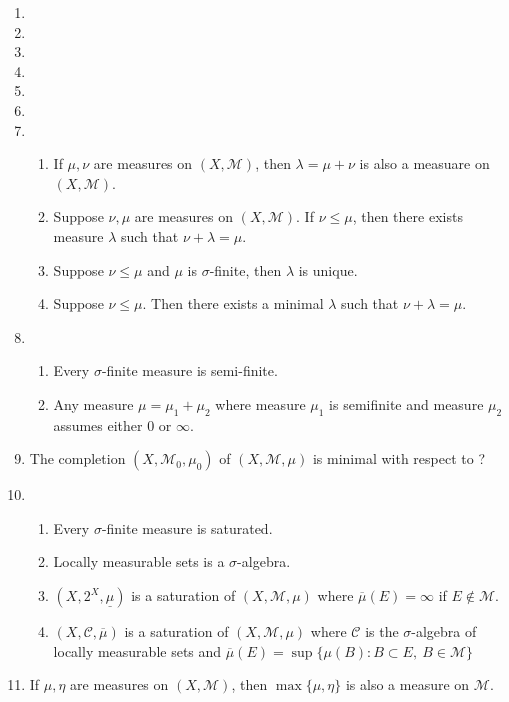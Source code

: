 \begin{enumerate}
	\item
	\item
	\item
	\item
	\item
	\item
	\item
	\begin{enumerate}
		\item If $\mu,\nu$ are measures on $(X,\mathcal{M})$, then $\lambda = \mu + \nu$ is also a measuare on $(X,\mathcal{M})$.
		\item Suppose $\nu,\mu$ are measures on $(X,\mathcal{M})$. If $\nu \le \mu$, then there exists measure $\lambda$ such that $\nu+\lambda = \mu$.
		\item Suppose $\nu \le \mu$ and $\mu$ is $\sigma$-finite, then $\lambda$ is unique.
		\item Suppose $\nu \le \mu$. Then there exists a minimal $\lambda$ such that $\nu+\lambda = \mu$.
	\end{enumerate}
	\item
	\begin{enumerate}
		\item Every $\sigma$-finite measure is semi-finite.
		\item Any measure $\mu = \mu_1 + \mu_2$ where measure $\mu_1$ is semifinite and measure $\mu_2$ assumes either $0$ or $\infty$.
	\end{enumerate}
	\item The completion $(X,\mathcal{M}_0,\mu_0)$ of $(X,\mathcal{M},\mu)$ is minimal with respect to ?
	\item
	\begin{enumerate}
		\item Every $\sigma$-finite measure is saturated.
		\item Locally measurable sets is a $\sigma$-algebra.
		\item $(X,2^X,\underline{\mu})$ is a saturation of $(X,\mathcal{M},\mu)$ where $\overline{\mu}(E) = \infty$ if $E \notin \mathcal{M}$.
		\item $(X,\mathcal{C},\overline{\mu})$ is a saturation of $(X,\mathcal{M},\mu)$ where $\mathcal{C}$ is the $\sigma$-algebra of locally measurable sets and $\overline{\mu}(E) = \sup \{ \mu(B) : B \subset E,\ B \in \mathcal{M} \}$
	\end{enumerate}
	\item If $\mu,\eta$ are measures on $(X,\mathcal{M})$, then $\max\{\mu,\eta\}$ is also a measure on $\mathcal{M}$.
\end{enumerate}

